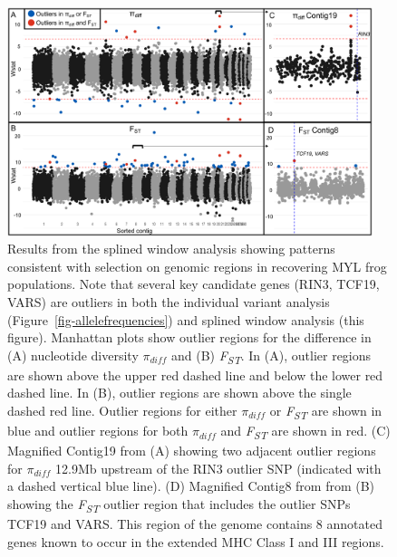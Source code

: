 \documentclass[9pt,twocolumn,twoside,lineno]{pnas-new}
\begin{document}
\begin{figure}

{\centering \includegraphics[width=0.95\textwidth]{figures/splinewindow_manhattan.png}

}

\caption{\label{fig-spline-manhattan}Results from the splined window
analysis showing patterns consistent with selection on genomic regions
in recovering MYL frog populations. Note that several key candidate
genes (RIN3, TCF19, VARS) are outliers in both the individual variant
analysis (Figure~\ref{fig-allelefrequencies}) and splined window
analysis (this figure). Manhattan plots show outlier regions for the
difference in (A) nucleotide diversity \(\pi_{diff}\) and (B)
\emph{F\textsubscript{ST}}. In (A), outlier regions are shown above the
upper red dashed line and below the lower red dashed line. In (B),
outlier regions are shown above the single dashed red line. Outlier
regions for either \(\pi_{diff}\) or \emph{F\textsubscript{ST}} are
shown in blue and outlier regions for both \(\pi_{diff}\) and
\emph{F\textsubscript{ST}} are shown in red. (C) Magnified Contig19 from
(A) showing two adjacent outlier regions for \(\pi_{diff}\) 12.9Mb
upstream of the RIN3 outlier SNP (indicated with a dashed vertical blue
line). (D) Magnified Contig8 from from (B) showing the
\emph{F\textsubscript{ST}} outlier region that includes the outlier SNPs
TCF19 and VARS. This region of the genome contains 8 annotated genes
known to occur in the extended MHC Class I and III regions.}

\end{figure}

\newpage
\end{document}

